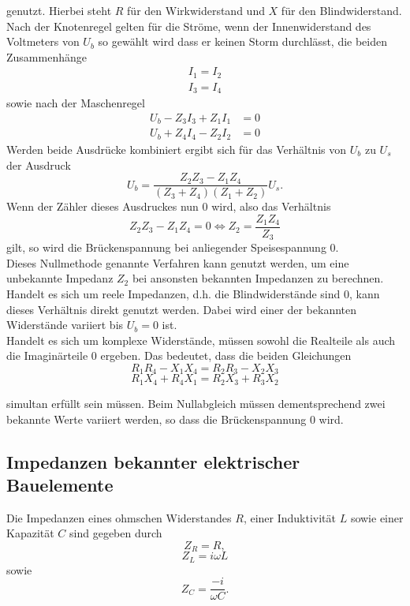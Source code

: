 genutzt.
Hierbei steht $R$ für den Wirkwiderstand und $X$ für den Blindwiderstand. \\
Nach der Knotenregel gelten für die Ströme, wenn der Innenwiderstand des Voltmeters von $U_b$ so gewählt wird dass er keinen Storm durchlässt, die beiden Zusammenhänge
\begin{gather}
  I_1 = I_2 \\
  I_3 = I_4
\end{gather}
sowie nach der Maschenregel
\begin{align}
  U_b - Z_3 I_3 + Z_1 I_1 &= 0 \\
  U_b + Z_4 I_4 - Z_2 I_2 &= 0
\end{align}
Werden beide Ausdrücke kombiniert ergibt sich für das Verhältnis von $U_b$ zu $U_s$ der Ausdruck
\begin{equation}
  U_b = \frac{Z_2 Z_3 - Z_1 Z_4}{(Z_3 + Z_4)(Z_1 + Z_2)}U_s.
\end{equation}
Wenn der Zähler dieses Ausdruckes nun 0 wird, also das Verhältnis
\begin{equation}
Z_2 Z_3 - Z_1 Z_4 = 0 \iff Z_2 = \frac{Z_1 Z_4}{Z_3} \label{eqn:1}
\end{equation}
gilt, so wird die Brückenspannung bei anliegender Speisespannung 0.\\
Dieses Nullmethode genannte Verfahren kann genutzt werden, um eine unbekannte Impedanz $Z_2$ bei ansonsten bekannten Impedanzen zu berechnen.
Handelt es sich um reele Impedanzen, d.h. die Blindwiderstände sind 0, kann dieses Verhältnis direkt genutzt werden.
Dabei wird einer der bekannten Widerstände variiert bis $U_b=0$ ist.\\
Handelt es sich um komplexe Widerstände, müssen sowohl die Realteile als auch die Imaginärteile 0 ergeben.
Das bedeutet, dass die beiden Gleichungen
\begin{equation}
  R_1 R_4 - X_1 X_4 = R_2 R_3 - X_2 X_3
  \label{eqn:bed1}
\end{equation}
\begin{equation}
  R_1 X_4 + R_4 X_1 = R_2 X_3 + R_3 X_2
  \label{eqn:bed2}
\end{equation}

simultan erfüllt sein müssen.
Beim Nullabgleich müssen dementsprechend zwei bekannte Werte variiert werden, so dass die Brückenspannung 0 wird.
\subsection{Impedanzen bekannter elektrischer Bauelemente}
Die Impedanzen eines ohmschen Widerstandes $R$, einer Induktivität $L$ sowie einer Kapazität $C$ sind gegeben durch
\begin{equation}
  Z_R = R,
\end{equation}
\begin{equation}
  Z_L = i \omega L
\end{equation}
sowie
\begin{equation}
  Z_C = \frac{-i}{\omega C}.
\end{equation}\cite{sample}
